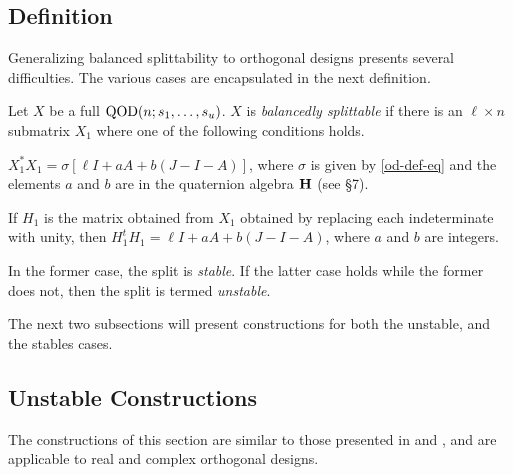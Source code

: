 \documentclass[../../../main]{subfiles}
\begin{document}
\subsection{Definition}

Generalizing balanced splittability to orthogonal designs presents several
difficulties. The various cases are encapsulated in the next definition. 

\begin{defin}
 Let $X$ be a full $\text{QOD}(n;s_1, \dots, s_u)$. $X$ is {\it balancedly splittable}
 if there is an $\ell \times n$ submatrix $X_1$ where one of the following
 conditions holds.
 \begin{defenum}
 \item $X_1^*X_1 = \sigma[\ell I + aA + b(J-I-A)]$, where $\sigma$ is given by
   \ref{od-def-eq} and the elements $a$ and $b$ are in the quaternion algebra
   $\mathbf{H}$ (see \S7).
 \item If $H_1$ is the matrix obtained from $X_1$ obtained by replacing each
   indeterminate with unity, then $H_1^tH_1 = \ell I + aA + b(J-I-A)$, where $a$
   and $b$ are integers.
 \end{defenum}
 In the former case, the split is {\it stable}. If the latter case holds while
 the former does not, then the split is termed {\it unstable}.
\end{defin}

The next two subsections will present constructions for both the unstable, and
the stables cases. 

\dinkus

\subsection{Unstable Constructions}

The constructions of this section are similar to those presented in \cite{fender-quh} and \cite{pender_2020}, and are applicable to real and complex orthogonal designs.
\end{document}
